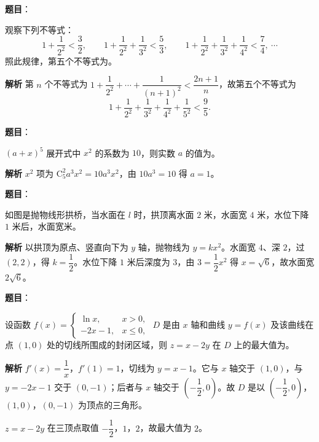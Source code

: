 \begin{answer}

\textbf{题目}：

观察下列不等式：
\nopagebreak[4]
\[1+\frac1{2^2}<\frac32,\qquad1+\frac1{2^2}+\frac1{3^2}<\frac53,\qquad1+\frac1{2^2}+\frac1{3^2}+\frac1{4^2}<\frac74,\ \cdots\]
照此规律，第五个不等式为\gkblank{}。

\textbf{解析}
第 $n$ 个不等式为 $1+\dfrac1{2^2}+\cdots+\dfrac1{(n+1)^2}<\dfrac{2n+1}{n}$，故第五个不等式为
\nopagebreak[4]
\[1+\frac1{2^2}+\frac1{3^2}+\frac1{4^2}+\frac1{5^2}<\frac95.\]


\end{answer}
\begin{answer}

\textbf{题目}：

$(a+x)^5$ 展开式中 $x^2$ 的系数为 $10$，则实数 $a$ 的值为\gkblank{}。

\textbf{解析}
$x^2$ 项为 $\mathrm C_5^2a^3x^2=10a^3x^2$，由 $10a^3=10$ 得 $a=1$。


\end{answer}
\begin{answer}

\textbf{题目}：

如图是抛物线形拱桥，当水面在 $l$ 时，拱顶离水面 $2$ 米，水面宽 $4$ 米，水位下降 $1$ 米后，水面宽\gkblank{}米。
\nopagebreak[4]
\begin{center}\end{center}
\nopagebreak[4]
\textbf{解析}
以拱顶为原点、竖直向下为 $y$ 轴，抛物线为 $y=kx^2$。水面宽 $4$、深 $2$，过 $(2,2)$，得 $k=\dfrac12$。水位下降 $1$ 米后深度为 $3$，由 $3=\dfrac12x^2$ 得 $x=\sqrt6$，故水面宽 $2\sqrt6$。


\end{answer}
\begin{answer}

\textbf{题目}：

设函数 $f(x)=\begin{cases}\ln x,&x>0,\\-2x-1,&x\leqslant0,\end{cases}$ $D$ 是由 $x$ 轴和曲线 $y=f(x)$ 及该曲线在点 $(1,0)$ 处的切线所围成的封闭区域，则 $z=x-2y$ 在 $D$ 上的最大值为\gkblank{}。

\textbf{解析}
$f'(x)=\dfrac1x$，$f'(1)=1$，切线为 $y=x-1$。它与 $x$ 轴交于 $(1,0)$，与 $y=-2x-1$ 交于 $(0,-1)$；后者与 $x$ 轴交于 $\left(-\dfrac12,0\right)$。故 $D$ 是以 $\left(-\dfrac12,0\right)$，$(1,0)$，$(0,-1)$ 为顶点的三角形。

$z=x-2y$ 在三顶点取值 $-\dfrac12$，$1$，$2$，故最大值为 $2$。


\end{answer}
